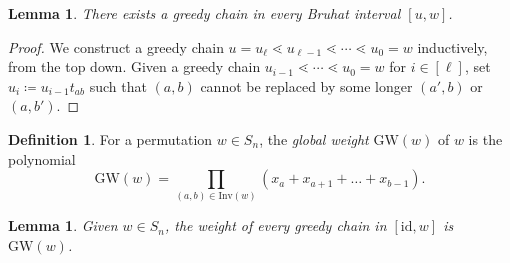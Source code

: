 \documentclass[11pt]{article}
\newtheorem{lemma}[theo]{Lemma}
\theoremstyle{definition}
\newtheorem{defi}[theo]{Definition}
\numberwithin{equation}{section}
\newcommand{\GW}{\mathrm{GW}}
\newcommand{\id}{\mathrm{id}}
\newcommand{\Inv}{\mathrm{Inv}}
\begin{document}
\begin{lemma}\label{lem:existsgreedychain}
    There exists a greedy chain in every Bruhat interval $[u, w]$. 
\end{lemma}

\begin{proof}
    We construct a greedy chain $u = u_{\ell} \lessdot u_{\ell-1} \lessdot\cdots\lessdot u_{0} = w$ inductively, from the top down. Given a greedy chain $ u_{i-1} \lessdot \cdots\lessdot u_{0} = w$ for $i\in [\ell]$, set $u_{i}\coloneq u_{i-1}t_{ab}$ such that $(a, b)$ cannot be replaced by some longer $(a', b)$ or $(a, b')$. 
\end{proof}

\begin{defi}\label{def:globalweight}
    For a permutation $w\in S_n$, the \emph{global weight} $\GW(w)$ of $w$ is the polynomial
    \[\GW(w) = \prod_{(a,b) \in \Inv(w)} (x_a+x_{a+1}+\dots +x_{b-1}).\]
\end{defi}


\begin{lemma}\label{lemma:greedy=GW}
    Given $w\in S_n$, the weight of every greedy chain in $[\id,w]$ is $\GW(w)$.
\end{lemma}
\end{document}
